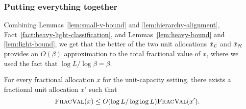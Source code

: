 \subsubsection*{Putting everything together}

Combining Lemmas~\ref{lem:small-v-bound} and \ref{lem:hierarchy-alignment},
Fact~\ref{fact:heavy-light-classification}, and Lemmas~\ref{lem:heavy-bound}
and \ref{lem:light-bound}, we get that the better of the two unit
allocations $\tilde{x}_{\mathcal{L}}$ and $\tilde{x}_{\mathcal{H}}$ provides an $O(\beta)$
approximation to the total fractional value of $x$, where we used the fact that
$\log L/\log \beta = \beta$.

\begin{theorem}
\label{thm:unit-capacity}
    For every fractional allocation $x$ for the unit-capacity setting, there
    exists a fractional unit allocation $x'$ such that
    \[
        {\normalfont\textsc{FracVal}}(x)\le  O(\log L/\log\log L){\normalfont\textsc{FracVal}}(x').
    \]
\end{theorem}

